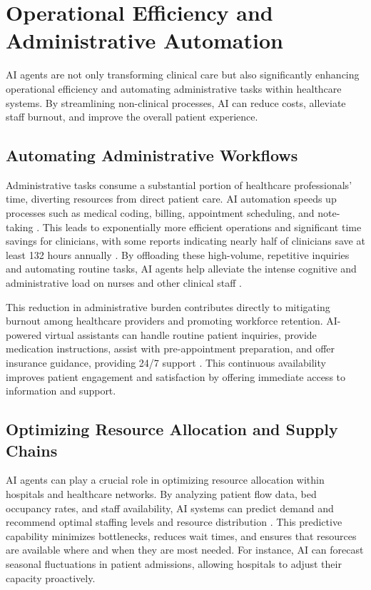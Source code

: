 \documentclass[12pt,a4paper]{article}
\begin{document}
\section{Operational Efficiency and Administrative Automation}
\label{sec:operational_efficiency}
AI agents are not only transforming clinical care but also significantly enhancing operational efficiency and automating administrative tasks within healthcare systems. By streamlining non-clinical processes, AI can reduce costs, alleviate staff burnout, and improve the overall patient experience.

\subsection{Automating Administrative Workflows}
\label{sec:admin_automation}
Administrative tasks consume a substantial portion of healthcare professionals' time, diverting resources from direct patient care. AI automation speeds up processes such as medical coding, billing, appointment scheduling, and note-taking \cite{salesforce.com}. This leads to exponentially more efficient operations and significant time savings for clinicians, with some reports indicating nearly half of clinicians save at least 132 hours annually \cite{salesforce.com}. By offloading these high-volume, repetitive inquiries and automating routine tasks, AI agents help alleviate the intense cognitive and administrative load on nurses and other clinical staff \cite{ey_global_regulatory}.

This reduction in administrative burden contributes directly to mitigating burnout among healthcare providers and promoting workforce retention. AI-powered virtual assistants can handle routine patient inquiries, provide medication instructions, assist with pre-appointment preparation, and offer insurance guidance, providing 24/7 support \cite{ibm_watson_health}. This continuous availability improves patient engagement and satisfaction by offering immediate access to information and support.

\subsection{Optimizing Resource Allocation and Supply Chains}
\label{sec:resource_optimization}
AI agents can play a crucial role in optimizing resource allocation within hospitals and healthcare networks. By analyzing patient flow data, bed occupancy rates, and staff availability, AI systems can predict demand and recommend optimal staffing levels and resource distribution \cite{dataart_digital_transformation}. This predictive capability minimizes bottlenecks, reduces wait times, and ensures that resources are available where and when they are most needed. For instance, AI can forecast seasonal fluctuations in patient admissions, allowing hospitals to adjust their capacity proactively.
\end{document}
